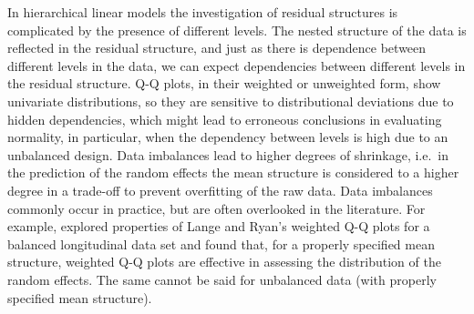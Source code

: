 \documentclass[12pt]{article} %
\newcommand{\hh}[1]{{\color{orange} #1}}
\newcommand{\al}[1]{{\color{red} #1}}
\begin{document}
In hierarchical linear models the investigation of residual structures is complicated by the presence of  different levels. 
The nested structure of the data is reflected in the residual structure, and just as there is dependence between different levels in the data, we can expect dependencies between different levels in the residual structure. 
Q-Q plots, in their weighted \citep{Dempster:1985tr, Lange:1989uu} or unweighted {form},  \hh{show univariate distributions, so they are sensitive to distributional deviations due to hidden dependencies}, which might lead to erroneous conclusions in evaluating normality, in particular, when the dependency between levels is high due to an unbalanced design. %
\hh{Data imbalances lead to higher degrees of shrinkage, i.e.~in the prediction of the random effects the mean structure is considered to a higher degree in a trade-off to prevent overfitting of the raw data.} 
Data imbalances commonly occur in practice, but are often overlooked in the literature. For example, \cite{Eberly:2005ee} explored properties of Lange and Ryan's weighted Q-Q plots for a balanced longitudinal data set and found that, for a properly specified mean structure,  weighted Q-Q plots are effective in  assessing the distribution of the random effects. The same cannot be said for unbalanced data (with properly specified mean structure). %




\end{document}
